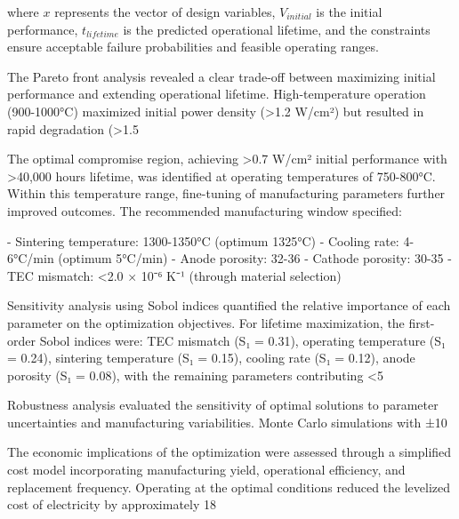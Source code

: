 \documentclass[conference]{IEEEtran}
\begin{document}
where $x$ represents the vector of design variables, $V_{initial}$ is the initial performance, $t_{lifetime}$ is the predicted operational lifetime, and the constraints ensure acceptable failure probabilities and feasible operating ranges.

The Pareto front analysis revealed a clear trade-off between maximizing initial performance and extending operational lifetime. High-temperature operation (900-1000°C) maximized initial power density (>1.2 W/cm²) but resulted in rapid degradation (>1.5%

The optimal compromise region, achieving >0.7 W/cm² initial performance with >40,000 hours lifetime, was identified at operating temperatures of 750-800°C. Within this temperature range, fine-tuning of manufacturing parameters further improved outcomes. The recommended manufacturing window specified:

- Sintering temperature: 1300-1350°C (optimum 1325°C)
- Cooling rate: 4-6°C/min (optimum 5°C/min)  
- Anode porosity: 32-36%
- Cathode porosity: 30-35%
- TEC mismatch: <2.0 × 10⁻⁶ K⁻¹ (through material selection)

Sensitivity analysis using Sobol indices quantified the relative importance of each parameter on the optimization objectives. For lifetime maximization, the first-order Sobol indices were: TEC mismatch (S₁ = 0.31), operating temperature (S₁ = 0.24), sintering temperature (S₁ = 0.15), cooling rate (S₁ = 0.12), anode porosity (S₁ = 0.08), with the remaining parameters contributing <5%

Robustness analysis evaluated the sensitivity of optimal solutions to parameter uncertainties and manufacturing variabilities. Monte Carlo simulations with ±10%

The economic implications of the optimization were assessed through a simplified cost model incorporating manufacturing yield, operational efficiency, and replacement frequency. Operating at the optimal conditions reduced the levelized cost of electricity by approximately 18%
\end{document}
